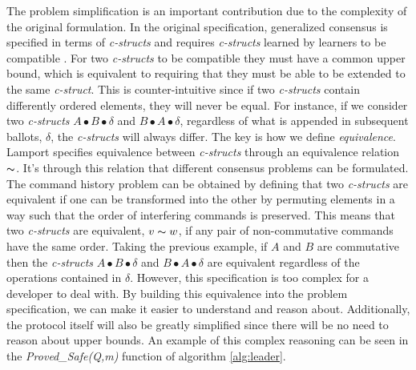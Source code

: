 \documentclass[runningheads,a4paper]{llncs}
\begin{document}
The problem simplification is an important contribution due to the complexity of the original formulation. In the original specification, generalized consensus is specified in terms of \textit{c-structs} and requires \textit{c-structs} learned by learners to be compatible \cite{Lamport2005}. For two \textit{c-structs} to be compatible they must have a common upper bound, which is equivalent to requiring that they must be able to be extended to the same \textit{c-struct}. This is counter-intuitive since if two \textit{c-structs} contain differently ordered elements, they will never be equal. For instance, if we consider two \textit{c-structs} $A \bullet B \bullet \delta$ and $B \bullet A \bullet \delta$, regardless of what is appended in subsequent ballots, $\delta$, the \textit{c-structs} will always differ. The key is how we define \textit{equivalence}. Lamport specifies equivalence between \textit{c-structs} through an equivalence relation $\thicksim$. It's through this relation that different consensus problems can be formulated. The command history problem can be obtained by defining that two \textit{c-structs} are equivalent if one can be transformed into the other by permuting elements in a way such that the order of interfering commands is preserved. This means that two \textit{c-structs} are equivalent, $v \thicksim w$, if any pair of non-commutative commands have the same order. Taking the previous example, if $A$ and $B$ are commutative then the \textit{c-structs} $A \bullet B \bullet \delta$ and $B \bullet A \bullet \delta$ are equivalent regardless of the operations contained in $\delta$. However, this specification is too complex for a developer to deal with. By building this equivalence into the problem specification, we can make it easier to understand and reason about. Additionally, the protocol itself will also be greatly simplified since there will be no need to reason about upper bounds. An example of this complex reasoning can be seen in the \textit{Proved\_Safe(Q,m)} function of algorithm \ref{alg:leader}.
\end{document}
